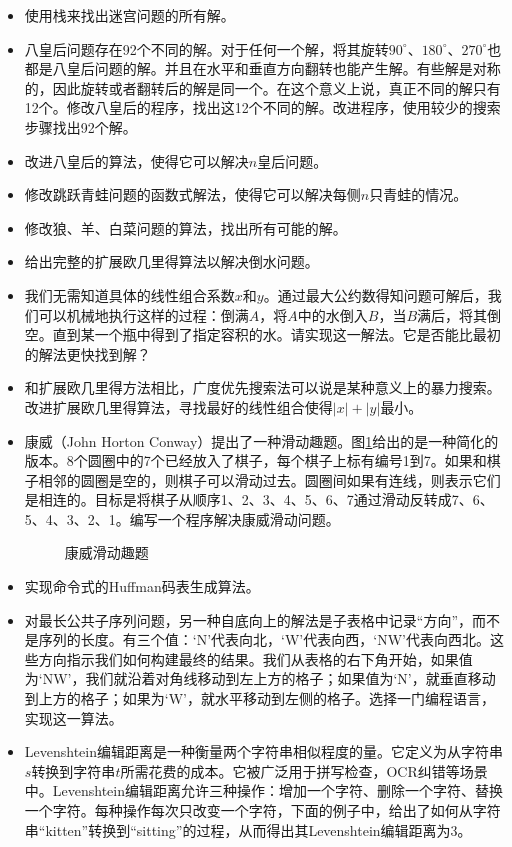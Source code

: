 \documentclass[b5paper]{ctexart}
\begin{document}
\begin{Exercise}
\begin{itemize}
\item 使用栈来找出迷宫问题的所有解。
\item 八皇后问题存在92个不同的解。对于任何一个解，将其旋转$90^{\circ}$、$180^{\circ}$、$270^{\circ}$也都是八皇后问题的解。并且在水平和垂直方向翻转也能产生解。有些解是对称的，因此旋转或者翻转后的解是同一个。在这个意义上说，真正不同的解只有12个。修改八皇后的程序，找出这12个不同的解。改进程序，使用较少的搜索步骤找出92个解。
\item 改进八皇后的算法，使得它可以解决$n$皇后问题。
\item 修改跳跃青蛙问题的函数式解法，使得它可以解决每侧$n$只青蛙的情况。
\item 修改狼、羊、白菜问题的算法，找出所有可能的解。
\item 给出完整的扩展欧几里得算法以解决倒水问题。
\item 我们无需知道具体的线性组合系数$x$和$y$。通过最大公约数得知问题可解后，我们可以机械地执行这样的过程：倒满$A$，将$A$中的水倒入$B$，当$B$满后，将其倒空。直到某一个瓶中得到了指定容积的水。请实现这一解法。它是否能比最初的解法更快找到解？
\item 和扩展欧几里得方法相比，广度优先搜索法可以说是某种意义上的暴力搜索。改进扩展欧几里得算法，寻找最好的线性组合使得$|x| + |y|$最小。
\item 康威（John Horton Conway）提出了一种滑动趣题。图\ref{fig:conway7}给出的是一种简化的版本。8个圆圈中的7个已经放入了棋子，每个棋子上标有编号1到7。如果和棋子相邻的圆圈是空的，则棋子可以滑动过去。圆圈间如果有连线，则表示它们是相连的。目标是将棋子从顺序1、2、3、4、5、6、7通过滑动反转成7、6、5、4、3、2、1。编写一个程序解决康威滑动问题。
\begin{figure}[htbp]
 \centering
 
 \caption{康威滑动趣题}
 \label{fig:conway7}
\end{figure}
\item 实现命令式的Huffman码表生成算法。
\item 对最长公共子序列问题，另一种自底向上的解法是子表格中记录“方向”，而不是序列的长度。有三个值：‘N’代表向北，‘W’代表向西，‘NW’代表向西北。这些方向指示我们如何构建最终的结果。我们从表格的右下角开始，如果值为‘NW’，我们就沿着对角线移动到左上方的格子；如果值为‘N’，就垂直移动到上方的格子；如果为‘W’，就水平移动到左侧的格子。选择一门编程语言，实现这一算法。
\item Levenshtein编辑距离是一种衡量两个字符串相似程度的量。它定义为从字符串$s$转换到字符串$t$所需花费的成本。它被广泛用于拼写检查，OCR纠错等场景中。Levenshtein编辑距离允许三种操作：增加一个字符、删除一个字符、替换一个字符。每种操作每次只改变一个字符，下面的例子中，给出了如何从字符串“kitten”转换到“sitting”的过程，从而得出其Levenshtein编辑距离为3。

\end{itemize}
\end{Exercise}
\end{document}
